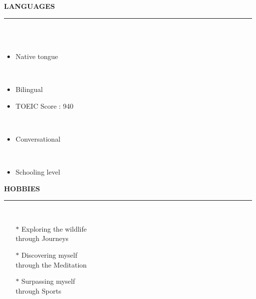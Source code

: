 \documentclass[9pt,a4paper]{article}
\newcommand{\myline}[1]{\rule{#1}{1.0pt}\\}
\newcommand{\topic}[1]{\textbf{\Large\selectfont\MakeUppercase{#1}}\\\vspace{-1em}\myline{1.0cm}}
\newcommand{\subtopic}[1]{\textbf{\normalsize\selectfont{#1}}\\}
\begin{document}
\begin{minipage}[c]{0.3\linewidth}
\begin{flushleft}
\vspace{1em}
\topic{Languages}
\subtopic{French} 
\vspace{-1em} 
\begin{itemize}
    \setlength\itemsep{-0.5em}
    \item Native tongue
\end{itemize}
\vspace{-1em} 
\subtopic{English} 
\vspace{-1em} 
\begin{itemize}
    \setlength\itemsep{-0.5em}
    \item Bilingual
    \item TOEIC Score : 940
\end{itemize}
\vspace{-1em} 
\subtopic{Portuguese \& Spanish} %
\vspace{-1em} 
\begin{itemize}
    \setlength\itemsep{-0.5em}
    \item Conversational   
\end{itemize}
\vspace{-1em} 
\subtopic{German} %
\vspace{-1em} 
\begin{itemize}
    \setlength\itemsep{-0.5em}
    \item Schooling level   
\end{itemize}

\vspace{1em}
\topic{Hobbies}
\vspace{-1em} 
\begin{itemize}%
    \setlength\itemsep{-0.5em}
    \item[$\ast$] \textrm{Exploring the wildlife \\through Journeys}
    \item[$\ast$] \textrm{Discovering myself \\through the Meditation}
    \item[$\ast$] \textrm{Surpassing myself \\through Sports}
\end{itemize}


\end{flushleft}
\end{minipage}
\end{document}
